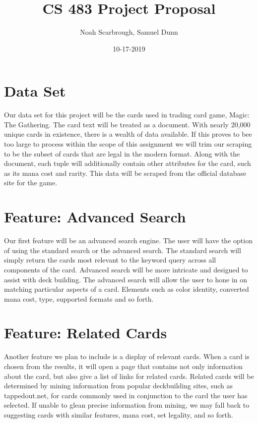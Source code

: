 \documentclass{article}
\title{CS 483 Project Proposal}
\author{Noah Scarbrough, Samuel Dunn}
\date{10-17-2019}
\begin{document}
\maketitle

\section{Data Set}
Our data set for this project will be the cards used in trading card game,
Magic: The Gathering. The card text will be treated as a document. 
With nearly 20,000 unique cards in existence, there is a wealth of data available.
If this proves to bee too large to process within the scope of this assignment we will
trim our scraping to be the subset of cards that are legal in the modern format. 
Along with the document, each tuple will additionally contain other attributes for the card, such as its mana cost and rarity. 
This data will be scraped from the official database site for the game.

\section{Feature: Advanced Search}
Our first feature will be an advanced search engine. 
The user will have the option of using the standard search or the advanced search. 
The standard search will simply return the cards most relevant to the keyword query across all components of the card. 
Advanced search will be more intricate and designed to assist with deck building. The advanced search will allow the user to hone in on matching particular aspects of a card. 
Elements such as color identity, converted mana cost, type, supported formats and so forth.

\section{Feature: Related Cards}
Another feature we plan to include is a display of relevant cards. 
When a card is chosen from the results, it will open a page that 
contains not only information about the card, but also give a list 
of links for related cards. Related cards will be determined by mining
information from popular deckbuilding sites, such as tappedout.net, for
cards commonly used in conjunction to the card the user has selected. 
If unable to glean precise information from mining, we may fall back
to suggesting cards with similar features, mana cost, set legality, and so forth.
\end{document}
